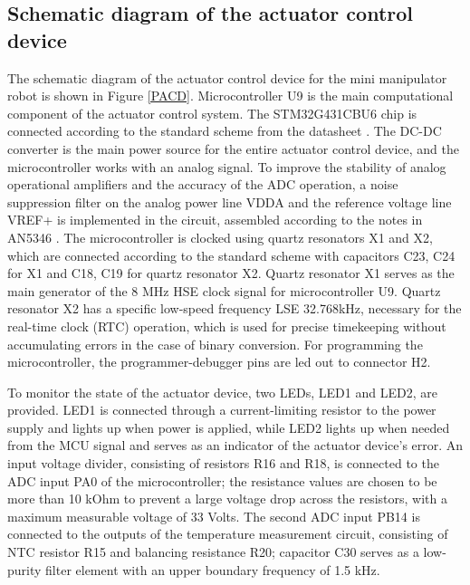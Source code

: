 

\subsection{Schematic diagram of the actuator control device}

The schematic diagram of the actuator control device for the mini manipulator robot is shown in Figure \ref{PACD}. Microcontroller U9 is the main computational component of the actuator control system. The STM32G431CBU6 chip is connected according to the standard scheme from the datasheet \citep{STM32G431}. The DC-DC converter is the main power source for the entire actuator control device, and the microcontroller works with an analog signal. To improve the stability of analog operational amplifiers and the accuracy of the ADC operation, a noise suppression filter on the analog power line VDDA and the reference voltage line VREF+ is implemented in the circuit, assembled according to the notes in AN5346 \citep{STM2019}. The microcontroller is clocked using quartz resonators X1 and X2, which are connected according to the standard scheme with capacitors C23, C24 for X1 and C18, C19 for quartz resonator X2. Quartz resonator X1 serves as the main generator of the 8 MHz HSE clock signal for microcontroller U9. Quartz resonator X2 has a specific low-speed frequency LSE 32.768kHz, necessary for the real-time clock (RTC) operation, which is used for precise timekeeping without accumulating errors in the case of binary conversion. For programming the microcontroller, the programmer-debugger pins are led out to connector H2.

To monitor the state of the actuator device, two LEDs, LED1 and LED2, are provided. LED1 is connected through a current-limiting resistor to the power supply and lights up when power is applied, while LED2 lights up when needed from the MCU signal and serves as an indicator of the actuator device's error. An input voltage divider, consisting of resistors R16 and R18, is connected to the ADC input PA0 of the microcontroller; the resistance values are chosen to be more than 10 kOhm to prevent a large voltage drop across the resistors, with a maximum measurable voltage of 33 Volts. The second ADC input PB14 is connected to the outputs of the temperature measurement circuit, consisting of NTC resistor R15 and balancing resistance R20; capacitor C30 serves as a low-purity filter element with an upper boundary frequency of 1.5 kHz.

